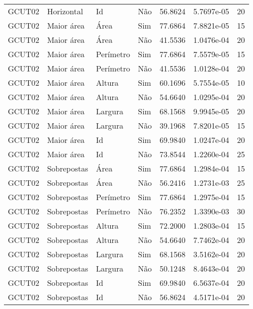 \begin{tabular}{llllrrr}
GCUT02    & Horizontal  & Id        & Não         & 56.8624      & 5.7697e-05 & 20       \\
GCUT02    & Maior área  & Área      & Sim         & 77.6864      & 7.8821e-05 & 15       \\
GCUT02    & Maior área  & Área      & Não         & 41.5536      & 1.0476e-04 & 20       \\
GCUT02    & Maior área  & Perímetro & Sim         & 77.6864      & 7.5579e-05 & 15       \\
GCUT02    & Maior área  & Perímetro & Não         & 41.5536      & 1.0128e-04 & 20       \\
GCUT02    & Maior área  & Altura    & Sim         & 60.1696      & 5.7554e-05 & 10       \\
GCUT02    & Maior área  & Altura    & Não         & 54.6640      & 1.0295e-04 & 20       \\
GCUT02    & Maior área  & Largura   & Sim         & 68.1568      & 9.9945e-05 & 20       \\
GCUT02    & Maior área  & Largura   & Não         & 39.1968      & 7.8201e-05 & 15       \\
GCUT02    & Maior área  & Id        & Sim         & 69.9840      & 1.0247e-04 & 20       \\
GCUT02    & Maior área  & Id        & Não         & 73.8544      & 1.2260e-04 & 25       \\
GCUT02    & Sobrepostas & Área      & Sim         & 77.6864      & 1.2984e-04 & 15       \\
GCUT02    & Sobrepostas & Área      & Não         & 56.2416      & 1.2731e-03 & 25       \\
GCUT02    & Sobrepostas & Perímetro & Sim         & 77.6864      & 1.2975e-04 & 15       \\
GCUT02    & Sobrepostas & Perímetro & Não         & 76.2352      & 1.3390e-03 & 30       \\
GCUT02    & Sobrepostas & Altura    & Sim         & 72.2000      & 1.2803e-04 & 15       \\
GCUT02    & Sobrepostas & Altura    & Não         & 54.6640      & 7.7462e-04 & 20       \\
GCUT02    & Sobrepostas & Largura   & Sim         & 68.1568      & 3.5162e-04 & 20       \\
GCUT02    & Sobrepostas & Largura   & Não         & 50.1248      & 8.4643e-04 & 20       \\
GCUT02    & Sobrepostas & Id        & Sim         & 69.9840      & 6.5637e-04 & 20       \\
GCUT02    & Sobrepostas & Id        & Não         & 56.8624      & 4.5171e-04 & 20       \\
\hline
\end{tabular}